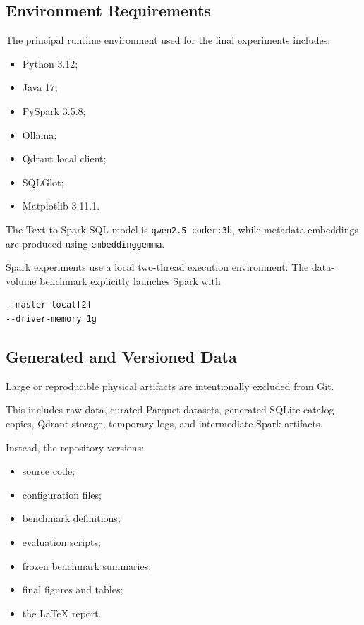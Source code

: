 \subsection{Environment Requirements}

The principal runtime environment used for the final experiments includes:

\begin{itemize}

    \item Python 3.12;
    \item Java 17;
    \item PySpark 3.5.8;
    \item Ollama;
    \item Qdrant local client;
    \item SQLGlot;
    \item Matplotlib 3.11.1.

\end{itemize}

The Text-to-Spark-SQL model is
\texttt{qwen2.5-coder:3b}, while metadata embeddings are produced using
\texttt{embeddinggemma}.

Spark experiments use a local two-thread execution environment. The
data-volume benchmark explicitly launches Spark with

\begin{verbatim}
--master local[2]
--driver-memory 1g
\end{verbatim}


\subsection{Generated and Versioned Data}

Large or reproducible physical artifacts are intentionally excluded from Git.

This includes raw data, curated Parquet datasets, generated SQLite catalog
copies, Qdrant storage, temporary logs, and intermediate Spark artifacts.

Instead, the repository versions:

\begin{itemize}

    \item source code;
    \item configuration files;
    \item benchmark definitions;
    \item evaluation scripts;
    \item frozen benchmark summaries;
    \item final figures and tables;
    \item the LaTeX report.

\end{itemize}


